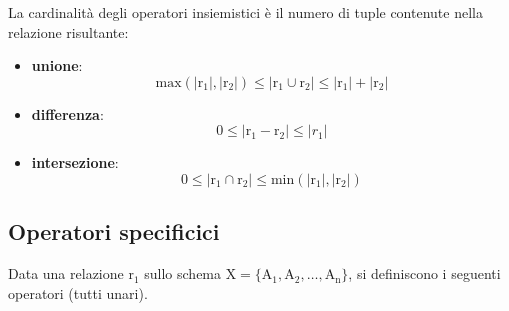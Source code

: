 \documentclass[12pt, a4paper, oneside]{book}
\begin{document}
    La cardinalità degli operatori insiemistici è il numero di tuple contenute nella relazione risultante:
    \begin{itemize}
      \item \textbf{unione}:
      \begin{equation*}
        \mathrm{max(|r_1|, |r_2|)} \le |\mathrm{r_1} \cup \mathrm{r_2}| \le |\mathrm{r_1}| + |\mathrm{r_2}|
      \end{equation*}
      \smallskip
      \item \textbf{differenza}:
      \begin{equation*}
        0 \le |\mathrm{r_1} - \mathrm{r_2}| \le |r_1|
      \end{equation*}
      \smallskip
      \item \textbf{intersezione}:
      \begin{equation*}
        0 \le |\mathrm{r_1} \cap \mathrm{r_2}| \le \mathrm{min}(|\mathrm{r_1}|, |\mathrm{r_2}|)
      \end{equation*}
    \end{itemize}

    \subsection{Operatori specificici}
    Data una relazione $\mathrm{r_1}$ sullo schema $\mathrm{X} = \{\mathrm{A_1}, \mathrm{A_2}, \dots, \mathrm{A_n}\}$, si definiscono i seguenti operatori (tutti unari).
\end{document}
